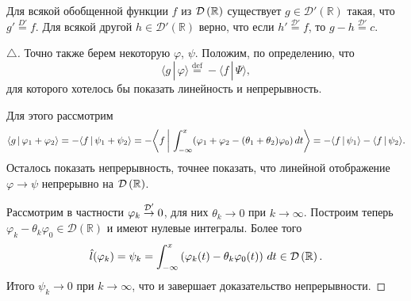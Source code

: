 \begin{to_thr}[]
    Для всякой обобщенной функции $f$ из $\mathcal D\left(\mathbb{R}\right)$ существует $g \in \mathcal D' (\mathbb{R})$ такая, что $g' \overset{D'}{=}  f$. Для всякой другой $h \in \mathcal D'\left(\mathbb{R}\right)$ верно, что  если $h' \overset{\mathcal D'}{=} f$, то $g - h \overset{\mathcal D'}{=} c$.
\end{to_thr}

\begin{proof}[$\triangle$]
    Точно также берем некоторую $\varphi$, $\psi$. Положим, по определению, что 
    \begin{equation*}
        \langle g \,|\, \varphi \rangle \overset{\mathrm{def}}{=} - \langle f \,|\, \Psi \rangle ,
    \end{equation*}
    для которого хотелось бы показать линейность и непрерывность. 

Для этого рассмотрим
\begin{equation*}
    \langle g \,|\, \varphi_1 + \varphi_2 \rangle = - \langle f \,|\, \psi_1 + \psi_2 \rangle =
    - \bigg\langle f \,\bigg|\, \int_{-\infty}^{x} (\varphi_1 + \varphi_2 - (\theta_1 + \theta_2) \varphi_0) \, d t \bigg\rangle = - \langle f \,|\, \psi_1 \rangle- \langle f \,|\, \psi_2 \rangle.
\end{equation*}
Осталось показать непрерывность, точнее показать, что линейной отображение $\varphi \to \psi$ непрерывно на $\mathcal D\left(\mathbb{R}\right)$.

Рассмотрим в частности $\varphi_k \overset{\mathcal D'}{\to} 0$, для них $\theta_k \to 0$  при $k \to \infty$. Построим теперь $\varphi_k - \theta_k \varphi_0 \in \mathcal D(\mathbb{R})$ и имеют нулевые интегралы. Более того 
\begin{equation*}
    \hat{l} (\varphi_k) = \psi_k = \int_{-\infty}^{x} \left(
        \varphi_k (t) - \theta_k \varphi_0 (t)
    \right) \, d t \in \mathcal D\left(\mathbb{R}\right).
\end{equation*}
Итого $\psi_k \to 0$ при $k \to \infty$, что и завершает доказательство непрерывности. 

\end{proof}
